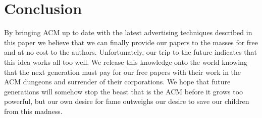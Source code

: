 \section{Conclusion}
By bringing ACM up to date with the latest advertising techniques described in
this paper we believe that we can finally provide our papers to the masses for
free and at no cost to the authors.
Unfortunately, our trip to the future indicates that this idea works all too
well.
We release this knowledge onto the world knowing that the next generation must
pay for our free papers with their work in the ACM dungeons and surrender of
their corporations.
We hope that future generations will somehow stop the beast that is the ACM
before it grows too powerful, but our own desire for fame outweighs our desire
to save our children from this madness.
